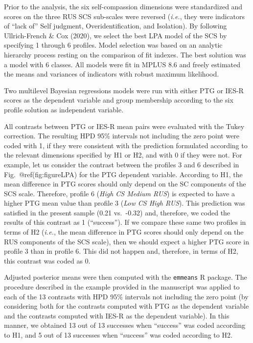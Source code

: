 \documentclass[aps,floatfix,prl]{revtex4}
\begin{document}
Prior to the analysis, the six self-compassion dimensions were
standardized and scores on the three RUS SCS sub-scales were reversed
(\emph{i.e.}, they were indicators of ``lack of'' Self judgment,
Overidentification, and Isolation). By following Ullrich-French \& Cox
(2020), we select the best LPA model of the SCS by specifying 1 through
6 profiles. Model selection was based on an analytic hierarchy process
resting on the comparison of fit indexes. The best solution was a model
with 6 classes. All models were fit in MPLUS 8.6 and freely estimated
the means and variances of indicators with robust maximum likelihood.

Two multilevel Bayesian regressions models were run with either PTG or
IES-R scores as the dependent variable and group membership according to
the six profile solution as independent variable.

All contrasts between PTG or IES-R mean pairs were evaluated with the
Tukey correction. The resulting HPD 95\% intervals not including the
zero point were coded with 1, if they were consistent with the
prediction formulated according to the relevant dimensions specified by
H1 or H2, and with 0 if they were not. For example, let us consider the
contrast between the profiles 3 and 6 described in
Fig.~@ref(fig:figureLPA) for the PTG dependent variable. According to
H1, the mean difference in PTG scores should only depend on the SC
components of the SCS scale. Therefore, profile 6 (\emph{High CS Medium
RUS}) is expected to have a higher PTG mean value than profile 3
(\emph{Low CS High RUS}). This prediction was satisfied in the present
sample (0.21 vs.~-0.32) and, therefore, we coded the results of this
contrast as 1 (``success''). If we compare these same two profiles in
terms of H2 (\emph{i.e.}, the mean difference in PTG scores should only
depend on the RUS components of the SCS scale), then we should expect a
higher PTG score in profile 3 than in profile 6. This did not happen
and, therefore, in terms of H2, this contrast was coded as 0.

Adjusted posterior means were then computed with the \texttt{emmeans} R
package. The procedure described in the example provided in the
manuscript was applied to each of the 13 contrasts with HPD 95\%
intervals not including the zero point (by considering both for the
contrasts computed with PTG as the dependent variable and the contrasts
computed with IES-R as the dependent variable). In this manner, we
obtained 13 out of 13 successes when ``success'' was coded according to
H1, and 5 out of 13 successes when ``success'' was coded according to
H2.
\end{document}
